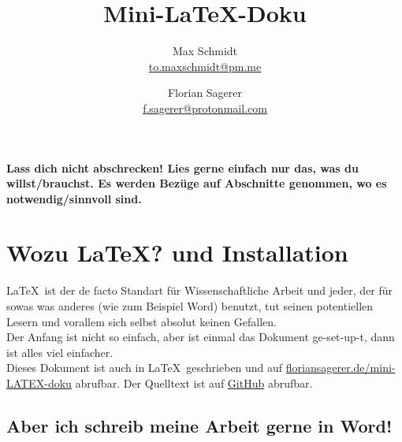 \documentclass{article}
\begin{document}
\title{Mini-\LaTeX-Doku}
\author{Max Schmidt \\ \href{mailto:to.maxschmidt@pm.me}{to.maxschmidt@pm.me}
   \and Florian Sagerer \\ \href{mailto:f.sagerer@protonmail.com}{f.sagerer@protonmail.com} }

\maketitle
\thispagestyle{empty}

\tableofcontents
\thispagestyle{empty}
\newpage

{\setlength{\parindent}{0cm}
\large{\textbf{Lass dich nicht abschrecken! Lies gerne einfach nur das, was du willst/brauchst. Es werden Bezüge auf Abschnitte genommen, wo es notwendig/sinnvoll sind.}}
}

\section{Wozu \LaTeX? und Installation}


\LaTeX\ ist der de facto Standart für Wissenschaftliche Arbeit und jeder, der für sowas was anderes (wie zum Beispiel Word) benutzt, tut seinen potentiellen Lesern und vorallem sich selbst absolut keinen Gefallen. \\
Der Anfang ist nicht so einfach, aber ist einmal das Dokument ge-set-up-t, dann ist alles viel einfacher. \\

Dieses Dokument ist auch in \LaTeX\ geschrieben und auf \href{https://floriansagerer.de/mini-LATEX-doku/}{floriansagerer.de/mini-LATEX-doku} abrufbar. 
Der Quelltext ist auf \href{https://github.com/QrxLP/mini-LATEX-doku}{GitHub} abrufbar.


\subsection{Aber ich schreib meine Arbeit gerne in Word!}
\end{document}
